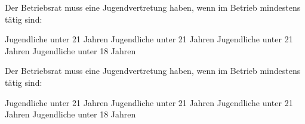 \documentclass{exam}
\begin{document}
\begin{center}
\begin{questions}
		 \question Der Betriebsrat muss eine Jugendvertretung haben, wenn im Betrieb mindestens tätig sind: 
		\begin{checkboxes}
			 Jugendliche unter 21 Jahren
			 Jugendliche unter 21 Jahren 
			 Jugendliche unter 21 Jahren
			 Jugendliche unter 18 Jahren
		\end{checkboxes}
		\newpage	
		\printanswers
		Der Betriebsrat muss eine Jugendvertretung haben, wenn im Betrieb mindestens tätig sind: 
		\begin{checkboxes}
			 Jugendliche unter 21 Jahren
			 Jugendliche unter 21 Jahren 
			 Jugendliche unter 21 Jahren
			 Jugendliche unter 18 Jahren
		\end{checkboxes}
	
	\end{questions}
\end{center}
\end{document}
